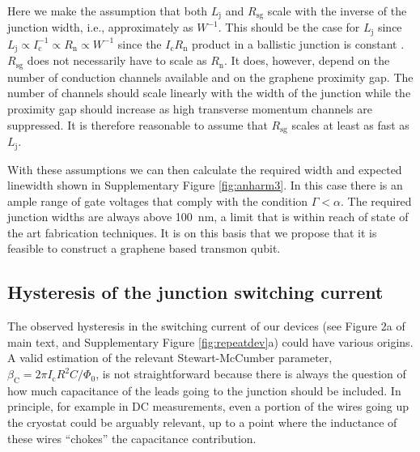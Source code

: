 Here we make the assumption that both $L_\text{j}$ and $R_\text{sg}$ scale with the inverse of the junction width, i.e., approximately as $W^{-1}$.
This should be the case for $L_\text{j}$ since $L_\text{j} \propto I_\text{c}^{-1} \propto R_\text{n} \propto W^{-1}$ since the $I_\text{c}R_\text{n}$ product in a ballistic junction is constant \cite{titov_josephson_2006}.
$R_\text{sg}$ does not necessarily have to scale as $R_\text{n}$.
It does, however, depend on the number of conduction channels available and on the graphene proximity gap.
The number of channels should scale linearly with the width of the junction while the proximity gap should increase as high transverse momentum channels are suppressed.
It is therefore reasonable to assume that $R_\text{sg}$ scales at least as fast as $L_\text{j}$.

With these assumptions we can then calculate the required width and expected linewidth shown in Supplementary Figure \ref{fig:anharm3}.
In this case there is an ample range of gate voltages that comply with the condition $\Gamma<\alpha$.
The required junction widths are always above \SI{100}{nm}, a limit that is within reach of state of the art fabrication techniques.
It is on this basis that we propose that it is feasible to construct a graphene based transmon qubit.




\subsection{Hysteresis of the junction switching current}\label{sec:hysteresis}
\noindent The observed hysteresis in the switching current of our devices (see Figure 2a of main text, and Supplementary Figure \ref{fig:repeatdev}a) could have various origins.
A valid estimation of the relevant Stewart-McCumber parameter\cite{tinkham_introduction_1996}, $\beta_\text{C}=2\pi I_\text{c}R^2C/\Phi_0$, is not straightforward because there is always the question of how much capacitance of the leads going to the junction should be included.
In principle, for example in DC measurements, even a portion of the wires going up the cryostat could be arguably relevant, up to a point where the inductance of these wires ``chokes'' the capacitance contribution.

